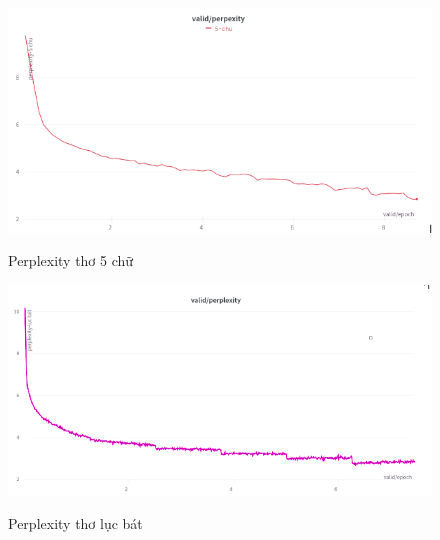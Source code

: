 \documentclass[a4paper]{article}
\theoremstyle{definition}
\begin{document}
\begin{figure}[h!]
\begin{center}
\includegraphics[width=15cm]{Images/21.png} \\[0.25in]

\caption{Perplexity thơ 5 chữ}
\end{center}
\end{figure}
\begin{figure}[h!]
\begin{center}
\includegraphics[width=15cm]{Images/22.png} \\[0.25in]

\caption{Perplexity thơ lục bát}
\end{center}
\end{figure}

\newpage
\newpage
\end{document}
